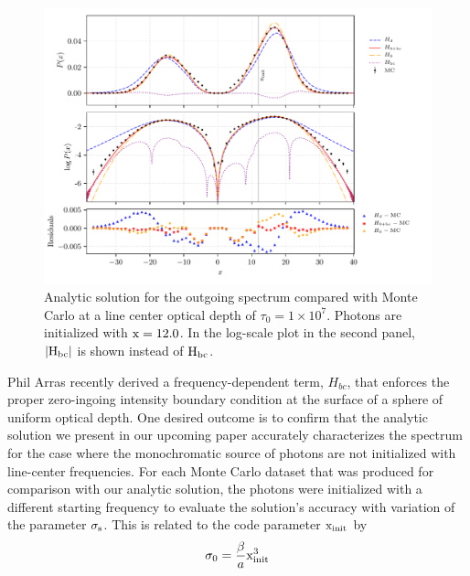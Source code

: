 \documentclass[onecolumn]{aastex63}
\begin{document}
\begin{figure}
    \centering
    \includegraphics{pdf_xinit12.pdf}
    \caption{Analytic solution for the outgoing spectrum compared with Monte Carlo at a line center optical depth of $\tau_0 = 1 \times 10^7$. Photons are initialized with $\rm x = 12.0$. In the log-scale plot in the second panel, $|\rm H_{bc}|$ is shown instead of $\rm H_{bc}$.} 
    \label{fig:sol_mc_residual_12}
\end{figure}

Phil Arras recently derived a frequency-dependent term, $H_{bc}$, that enforces the proper zero-ingoing intensity boundary condition at the surface of a sphere of uniform optical depth. One desired outcome is to confirm that the analytic solution we present in our upcoming paper accurately characterizes the spectrum for the case where the monochromatic source of photons are not initialized with line-center frequencies. For each Monte Carlo dataset that was produced for comparison with our analytic solution, the photons were initialized with a different starting frequency to evaluate the solution's accuracy with variation of the parameter $\rm \sigma_s$. This is related to the code parameter $\rm x_{init}$ by 
\begin{equation} \label{sigma0_xinit}
    \sigma_0 = \frac{\beta}{a} \rm x_{init}^3
\end{equation}
\end{document}
